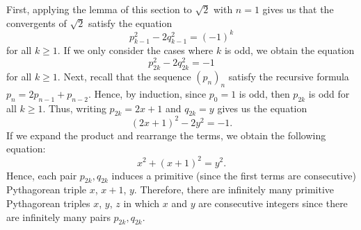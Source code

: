 \begin{solution}
    First, applying the lemma of this section to $\sqrt{2}$ with $n = 1$ gives us that the convergents of $\sqrt{2}$ satisfy the equation
    $$p_{k-1}^2 - 2q_{k-1}^2 = (-1)^k$$
    for all $k \geq 1$. If we only consider the cases where $k$ is odd, we obtain the equation 
    $$p_{2k}^2 - 2q_{2k}^2 = -1$$
    for all $k \geq 1$. Next, recall that the sequence $(p_n)_n$ satisfy the recursive formula $p_n = 2p_{n-1} + p_{n-2}$. Hence, by induction, since $p_0 = 1$ is odd, then $p_{2k}$ is odd for all $k \geq 1$. Thus, writing $p_{2k} = 2x + 1$ and $q_{2k} = y$ gives us the equation
    $$(2x + 1)^2 - 2y^2 = -1.$$
    If we expand the product and rearrange the terms, we obtain the following equation:
    $$x^2 + (x + 1)^2 = y^2.$$
    Hence, each pair $p_{2k}, q_{2k}$ induces a primitive (since the first terms are consecutive) Pythagorean triple $x$, $x + 1$, $y$. Therefore, there are infinitely many primitive Pythagorean triples $x$, $y$, $z$ in which $x$ and $y$ are consecutive integers since there are infinitely many pairs $p_{2k}, q_{2k}$.
\end{solution}